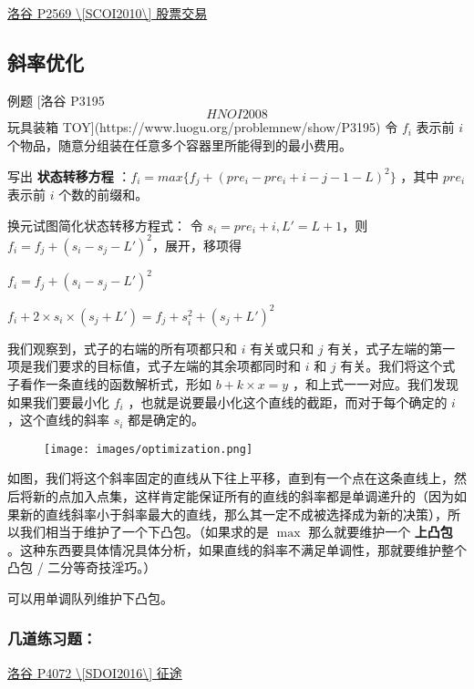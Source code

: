 \href{https://www.luogu.org/problemnew/show/P2569}{洛谷 P2569 \textbackslash{}[SCOI2010\textbackslash{}] 股票交易}

\subsection{斜率优化}

\begin{NOTE}{ 例题 [洛谷 P3195 \[HNOI2008\] 玩具装箱 TOY](https://www.luogu.org/problemnew/show/P3195)}{}
令 $f_i$ 表示前 $i$ 个物品，随意分组装在任意多个容器里所能得到的最小费用。
\end{NOTE}


写出 \textbf{ 状态转移方程 } ：$f_i=max\{f_j+(pre_i-pre_i+i-j-1-L)^2\}$ ，其中 $pre_i$ 表示前 $i$ 个数的前缀和。

换元试图简化状态转移方程式： 令 $s_i=pre_i+i,L'=L+1$，则 $f_i=f_j+(s_i-s_j-L')^2$，展开，移项得

$f_i=f_j+(s_i-s_j-L')^2$

$f_i+2\times s_i\times (s_j+L')=f_j+s_i^2+(s_j+L')^2$

我们观察到，式子的右端的所有项都只和 $i$ 有关或只和 $j$ 有关，式子左端的第一项是我们要求的目标值，式子左端的其余项都同时和 $i$ 和 $j$ 有关。我们将这个式子看作一条直线的函数解析式，形如 $b+k\times x=y$ ，和上式一一对应。我们发现如果我们要最小化 $f_i$ ，也就是说要最小化这个直线的截距，而对于每个确定的 $i$，这个直线的斜率 $s_i$ 都是确定的。

\begin{figure}[h]
\centering
\texttt{[image: images/optimization.png]} 

\end{figure}

如图，我们将这个斜率固定的直线从下往上平移，直到有一个点在这条直线上，然后将新的点加入点集，这样肯定能保证所有的直线的斜率都是单调递升的（因为如果新的直线斜率小于斜率最大的直线，那么其一定不成被选择成为新的决策），所以我们相当于维护了一个下凸包。（如果求的是 $\max$ 那么就要维护一个 \textbf{ 上凸包 } 。这种东西要具体情况具体分析，如果直线的斜率不满足单调性，那就要维护整个凸包 / 二分等奇技淫巧。）

可以用单调队列维护下凸包。

\subsubsection{几道练习题：}

\href{https://www.luogu.org/problemnew/show/P4072}{洛谷 P4072 \textbackslash{}[SDOI2016\textbackslash{}] 征途}

